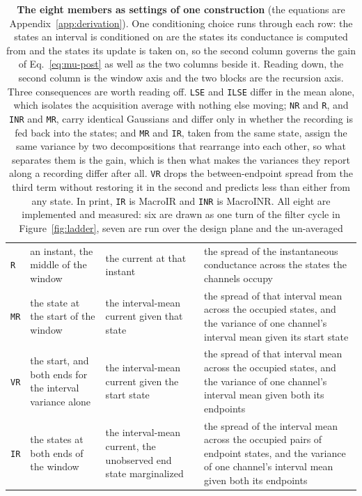 \begin{table}[htbp]
\begin{fullwidth}
\begin{tabularx}{\linewidth}{@{}l
    >{\hsize=0.80\hsize\raggedright\arraybackslash}X
    >{\hsize=0.95\hsize\raggedright\arraybackslash}X
    >{\hsize=1.25\hsize\raggedright\arraybackslash}X@{}}
\addlinespace[2pt]
\texttt{R} & an instant, the middle of the window & the current at that instant & the spread of the instantaneous conductance across the states the channels occupy \\
\texttt{MR} & the state at the start of the window & the interval-mean current given that state & the spread of that interval mean across the occupied states, and the variance of one channel's interval mean given its start state \\
\texttt{VR} & the start, and both ends for the interval variance alone & the interval-mean current given the start state & the spread of that interval mean across the occupied states, and the variance of one channel's interval mean given both its endpoints \\
\texttt{IR} & the states at both ends of the window & the interval-mean current, the unobserved end state marginalized & the spread of the interval mean across the occupied pairs of endpoint states, and the variance of one channel's interval mean given both its endpoints \\
\bottomrule
\end{tabularx}
\end{fullwidth}
\caption{\textbf{The eight members as settings of one construction} (the equations are
Appendix~\ref{app:derivation}). One conditioning choice runs through each row: the states an
interval is conditioned on are the states its conductance is computed from and the states its
update is taken on, so the second column governs the gain of Eq.~\ref{eq:mu-post} as well as
the two columns beside it. Reading down, the second column is the window axis and the two
blocks are the recursion axis. Three consequences are worth reading off. \texttt{LSE} and
\texttt{ILSE} differ in the mean alone, which isolates the acquisition average with nothing
else moving; \texttt{NR} and \texttt{R}, and \texttt{INR} and \texttt{MR}, carry identical
Gaussians and differ only in whether the recording is fed back into the states; and
\texttt{MR} and \texttt{IR}, taken from the same state, assign the same variance by two
decompositions that rearrange into each other, so what separates them is the gain, which is
then what makes the variances they report along a recording differ after all. \texttt{VR}
drops the between-endpoint spread from the third term without restoring it in the second and
predicts less than either from any state. In print, \texttt{IR} is MacroIR and \texttt{INR} is
MacroINR. All eight are implemented and measured: six are drawn as one turn of the filter
cycle in Figure~\ref{fig:ladder}, seven are run over the design plane and the un-averaged
}
\end{table}
